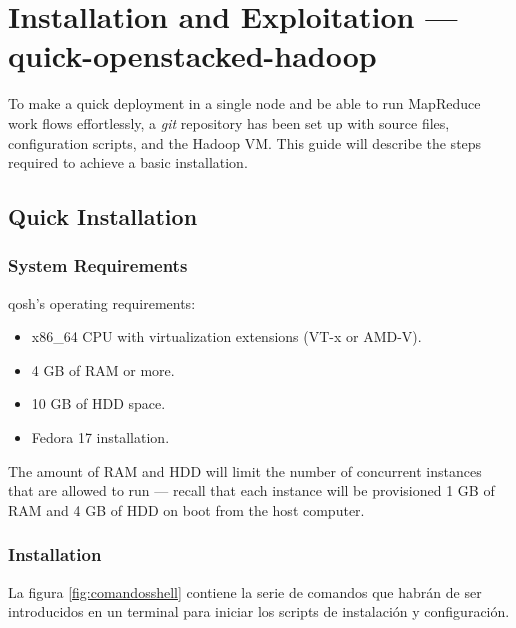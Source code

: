 \chapter{Installation and Exploitation --- quick-openstacked-hadoop}\label{cap:guiainstalacion}
\noindent To make a quick deployment in a single node and be able to run MapReduce work flows effortlessly, a \emph{git} repository has been set up with source files, configuration scripts, and the Hadoop VM. This guide will describe the steps required to achieve a basic installation.

\section{Quick Installation}\label{sec:instalacionqosh}

\subsection{System Requirements}\label{subsec:reqsis}
\noindent qosh's operating requirements:

\begin{itemize}
    \item x86\_64 CPU with virtualization extensions (VT-x or AMD-V).
    \item 4 GB of RAM or more.
    \item 10 GB of HDD space.
    \item Fedora 17 installation.
\end{itemize}

The amount of RAM and HDD will limit the number of concurrent instances that are allowed to run --- recall that each instance will be provisioned 1 GB of RAM and 4 GB of HDD on boot from the host computer.

\subsection{Installation}\label{subsec:instalacion}
\noindent La figura \ref{fig:comandosshell} contiene la serie de comandos que habr\'an de ser introducidos en un terminal para iniciar los scripts de instalaci\'on y configuraci\'on.

